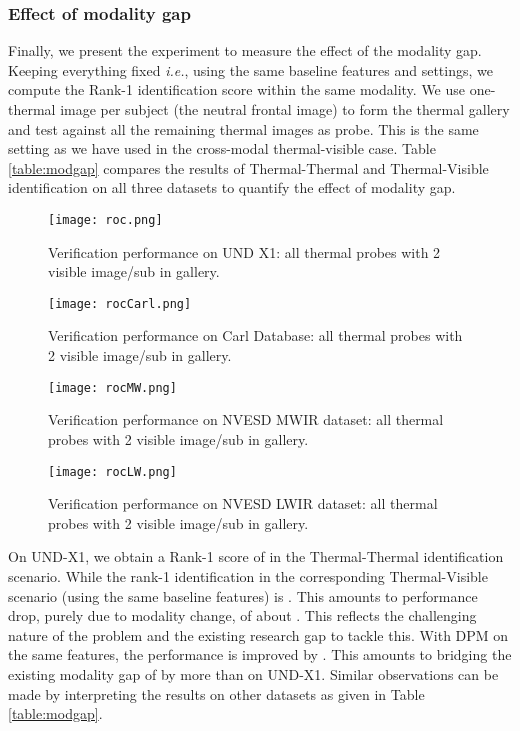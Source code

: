 \documentclass[smallextended,natbib]{svjour3}       \usepackage{graphicx}
\newcommand{\ie}{\emph{i.e.}}
\begin{document}
\subsubsection{Effect of modality gap}
Finally, we present the experiment to measure the effect of the modality gap. Keeping everything fixed \ie, using the same baseline features and settings, we compute the Rank-1 identification score within the same modality. We use one-thermal image per subject (the neutral frontal image) to form the thermal gallery and test against all the remaining thermal images as probe. This is the same setting as we have used in the cross-modal thermal-visible case. Table \ref{table:modgap} compares the results of Thermal-Thermal and Thermal-Visible identification on all three datasets to quantify the effect of modality gap.

\begin{figure}
  \begin{minipage}[t]{0.48\textwidth}  
    \texttt{[image: roc.png]}
	\caption{Verification performance on UND X1: all thermal probes with 2 visible image/sub in gallery.}
    \label{fig:7}
  \end{minipage}
  \hfill
  \begin{minipage}[t]{0.48\textwidth}
    \texttt{[image: rocCarl.png]}
\caption{Verification performance on Carl Database: all thermal probes with 2 visible image/sub in gallery.}    
        \label{fig:8}
  \end{minipage}
\end{figure}
\begin{figure}
  \begin{minipage}[t]{0.48\textwidth}  
    \texttt{[image: rocMW.png]}
	\caption{Verification performance on NVESD MWIR dataset: all thermal probes with 2 visible image/sub in gallery.}
    \label{fig:9}
  \end{minipage}
  \hfill
  \begin{minipage}[t]{0.48\textwidth}
    \texttt{[image: rocLW.png]}
\caption{Verification performance on NVESD LWIR dataset: all thermal probes with 2 visible image/sub in gallery.}    
        \label{fig:10}
  \end{minipage}
\end{figure}

On UND-X1, we obtain a Rank-1 score of  in the Thermal-Thermal identification scenario. While the rank-1 identification in the corresponding Thermal-Visible scenario (using the same baseline features) is . This amounts to performance drop, purely due to modality change, of about . This reflects the challenging nature of the problem and the existing research gap to tackle this. With DPM on the same features, the performance is improved by . This amounts to bridging the existing modality gap of  by more than  on UND-X1. Similar observations can be made by interpreting the results on other datasets as given in Table \ref{table:modgap}.
\end{document}
